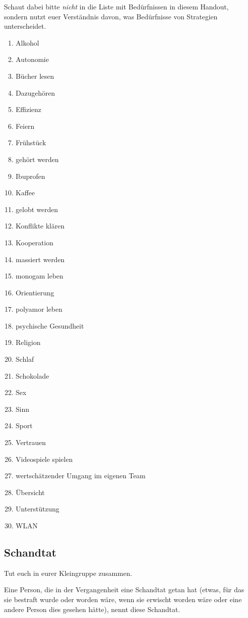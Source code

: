 Schaut dabei bitte \emph{nicht} in die Liste mit Bedürfnissen in diesem Handout, sondern nutzt euer Verständnis davon, was Bedürfnisse von Strategien unterscheidet.

\begin{enumerate}
    \item Alkohol
    \item Autonomie
    \item Bücher lesen
    \item Dazugehören
    \item Effizienz
    \item Feiern
    \item Frühstück
    \item gehört werden
    \item Ibuprofen
    \item Kaffee
    \item gelobt werden
    \item Konflikte klären
    \item Kooperation
    \item massiert werden
    \item monogam leben
    \item Orientierung
    \item polyamor leben
    \item psychische Gesundheit
    \item Religion
    \item Schlaf
    \item Schokolade
    \item Sex
    \item Sinn
    \item Sport
    \item Vertrauen
    \item Videospiele spielen
    \item wertschätzender Umgang im eigenen Team
    \item Übersicht
    \item Unterstützung
    \item WLAN
\end{enumerate}

\subsection{Schandtat}

Tut euch in eurer Kleingruppe zusammen.

Eine Person, die in der Vergangenheit eine \glqq Schandtat\grqq{} getan hat (etwas, für das sie bestraft wurde oder worden wäre, wenn sie erwischt worden wäre oder eine andere Person dies gesehen hätte), nennt diese Schandtat.

